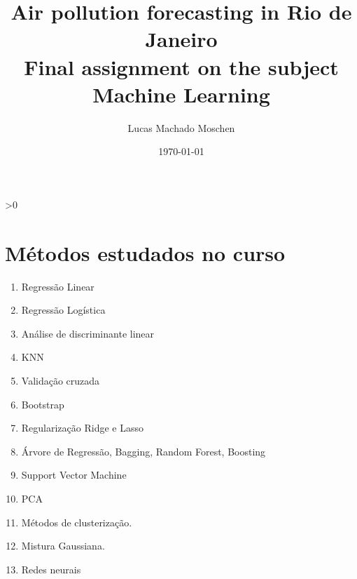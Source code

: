 \documentclass[10pt, twocolumn]{article}
\title{Air pollution forecasting in Rio de Janeiro
        \vspace{2mm}
       \\\large Final assignment on the subject Machine Learning 
}
\author{Lucas Machado Moschen}
\affil{School of Applied Mathematics, \\ Fundação Getulio Vargas}
\date{\today}
\begin{document}
\setcounter{num}{0}

\twocolumn[
    \begin{@twocolumnfalse}

        \maketitle

        \begin{abstract}
            
        \end{abstract}

        \vspace{7mm}

    \end{@twocolumnfalse}
]

\ifnum \value{num}>0
    {
    
    
    
    }
\else 
    {
    
    
    
    
    
    
    }
\fi

\newpage

\section*{Métodos estudados no curso}

\begin{enumerate}
    \item Regressão Linear
    \item Regressão Logística 
    \item Análise de discriminante linear 
    \item KNN
    \item Validação cruzada 
    \item Bootstrap
    \item Regularização Ridge e Lasso
    \item Árvore de Regressão, Bagging, Random Forest, Boosting 
    \item Support Vector Machine
    \item PCA 
    \item Métodos de clusterização. 
    \item Mistura Gaussiana.
    \item Redes neurais
\end{enumerate}

    \newpage



\twocolumn[
    \begin{@twocolumnfalse}
         
    \end{@twocolumnfalse}
]
\end{document}
